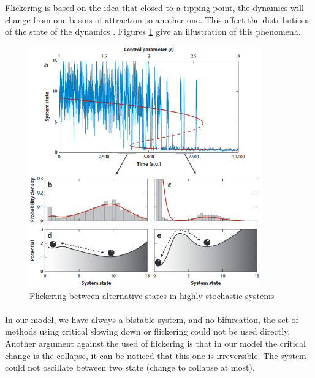 \documentclass{article}
\begin{document}
Flickering is based on the idea that closed to a tipping point, the dynamics will change from one basins of attraction to another one. This affect the distributions of the state of the dynamics \citep{carr_modeling_2012, wang_flickering_2012, dakos_flickering_2013, scheffer_anticipating_2012}. Figures \ref{flickering} give an illustration of this phenomena.


\begin{figure}[h]
\begin{center}
\includegraphics[width=10cm]{flickering.png}
\end{center}
\caption{\label{fig:temp}Flickering between alternative states in highly stochastic systems \citep{scheffer_anticipating_2012}}
\label{flickering}
\end{figure}

\paragraph{}
In our model, we have always a bistable system, and no bifurcation, the set of methods using critical slowing down or flickering could not be used directly. Another argument against the used of flickering is that in our model the critical change is the collapse, it can be noticed that this one is irreversible. The system could not oscillate between two state (change to collapse at most).
\end{document}
